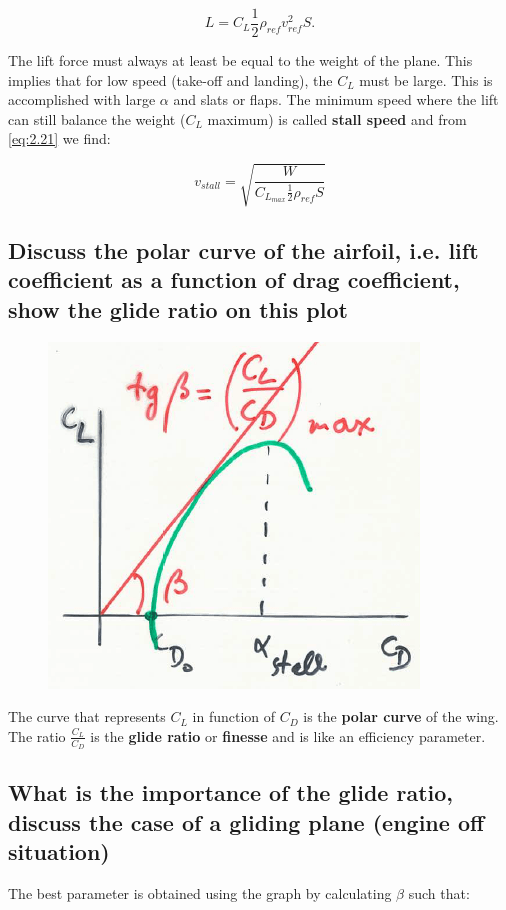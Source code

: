 \documentclass[british,french,11pt, a4paper, openany]{article}
\begin{document}
\begin{equation}
L = C_L \frac{1}{2} \rho _{ref} v^2_{ref} S.
\label{eq:2.21}
\end{equation}

The lift force must always at least be equal to the weight of the plane. This implies that for low speed (take-off and landing), the $C_L$ must be large. This is accomplished with large $\alpha$ and slats or flaps. The minimum speed where the lift can still balance the weight ($C_L$ maximum) is called \textbf{stall speed} and from \eqref{eq:2.21} we find:

\begin{equation}
v_{stall} = \sqrt{\frac{W}{C_{L_{max}} \frac{1}{2} \rho_{ref} S}}
\end{equation}

\subsection{Discuss the polar curve of the airfoil, i.e. lift coefficient as a function of drag	coefficient, show the glide ratio on this plot}
\begin{figure}
	\vspace{-5mm}
	\includegraphics[scale=0.3]{ch2/21}
\end{figure}
The curve that represents $C_L$ in function of $C_D$ is the \textbf{polar curve} of the wing. The ratio $\frac{C_L}{C_D}$ is the \textbf{glide ratio} or \textbf{finesse} and is like an efficiency parameter. 

\subsection{What is the importance of the glide ratio, discuss the case of a gliding plane	(engine off situation)}
The best parameter is obtained using the graph by calculating $\beta$ such that: 
\end{document}
